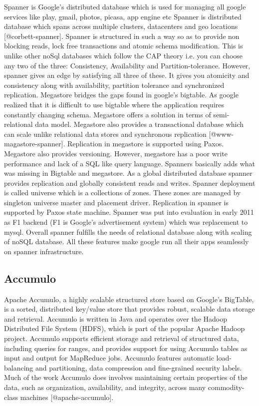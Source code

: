 Spanner is Google's distributed database which is used for managing
all google services like play, gmail, photos, picasa, app engine etc
Spanner is distributed database which spans across multiple clusters,
datacenters and geo locations [@corbett-spanner].  Spanner is
structured in such a way so as to provide non blocking reads, lock
free transactions and atomic schema modification. This is unlike other
noSql databases which follow the CAP theory i.e. you can choose any
two of the three: Consistency, Availability and
Partition-tolerance. However, spanner gives an edge by satisfying all
three of these. It gives you atomicity and consistency along with
availability, partition tolerance and synchronized replication.
Megastore bridges the gaps found in google's bigtable. As google
realized that it is difficult to use bigtable where the application
requires constantly changing schema. Megastore offers a solution in
terms of semi-relational data model.  Megastore also provides a
transactional database which can scale unlike relational data stores
and synchronous replication [@www-magastore-spanner].  Replication
in megastore is supported using Paxos. Megastore also provides
versioning. However, megastore has a poor write performance and lack
of a SQL like query language. Spanners basically adds what was missing
in Bigtable and megastore. As a global distributed database spanner
provides replication and globally consistent reads and writes. Spanner
deployment is called universe which is a collections of zones. These
zones are managed by singleton universe master and placement
driver. Replication in spanner is supported by Paxos state
machine. Spanner was put into evaluation in early 2011 as F1 backend
(F1 is Google's advertisement system) which was replacement to
mysql. Overall spanner fulfills the needs of relational database along
with scaling of noSQL database.  All these features make google run
all their apps seamlessly on spanner infrastructure.



\subsection{Accumulo}

Apache Accumulo, a highly scalable structured store based on Google's
BigTable, is a sorted, distributed key/value store that provides
robust, scalable data storage and retrieval. Accumulo is written in
Java and operates over the Hadoop Distributed File System (HDFS),
which is part of the popular Apache Hadoop project. Accumulo supports
efficient storage and retrieval of structured data, including queries
for ranges, and provides support for using Accumulo tables as input
and output for MapReduce jobs.  Accumulo features automatic
load-balancing and partitioning, data compression and fine-grained
security labels. Much of the work Accumulo does involves maintaining
certain properties of the data, such as organization, availability,
and integrity, across many commodity-class
machines [@apache-accumulo].

